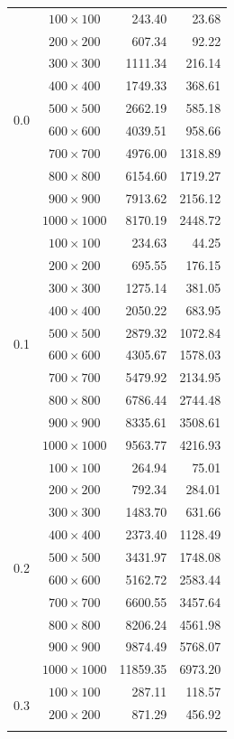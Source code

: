 \documentclass{article}
\begin{document}
\begin{longtable}{|c|c|r|r|}
\multirow{10}{*}{0.0}
&$100\times100$ & 243.40 & 23.68\\*
&$200\times200$ & 607.34 & 92.22\\*
&$300\times300$ & 1111.34 & 216.14\\*
&$400\times400$ & 1749.33 & 368.61\\*
&$500\times500$ & 2662.19 & 585.18\\*
&$600\times600$ & 4039.51 & 958.66\\*
&$700\times700$ & 4976.00 & 1318.89\\*
&$800\times800$ & 6154.60 & 1719.27\\*
&$900\times900$ & 7913.62 & 2156.12\\*
&$1000\times1000$ & 8170.19 & 2448.72\\
\hline
\multirow{10}{*}{0.1}
&$100\times100$ & 234.63 & 44.25\\*
&$200\times200$ & 695.55 & 176.15\\*
&$300\times300$ & 1275.14 & 381.05\\*
&$400\times400$ & 2050.22 & 683.95\\*
&$500\times500$ & 2879.32 & 1072.84\\*
&$600\times600$ & 4305.67 & 1578.03\\*
&$700\times700$ & 5479.92 & 2134.95\\*
&$800\times800$ & 6786.44 & 2744.48\\*
&$900\times900$ & 8335.61 & 3508.61\\*
&$1000\times1000$ & 9563.77 & 4216.93\\
\hline
\multirow{10}{*}{0.2}
&$100\times100$ & 264.94 & 75.01\\*
&$200\times200$ & 792.34 & 284.01\\*
&$300\times300$ & 1483.70 & 631.66\\*
&$400\times400$ & 2373.40 & 1128.49\\*
&$500\times500$ & 3431.97 & 1748.08\\*
&$600\times600$ & 5162.72 & 2583.44\\*
&$700\times700$ & 6600.55 & 3457.64\\*
&$800\times800$ & 8206.24 & 4561.98\\*
&$900\times900$ & 9874.49 & 5768.07\\*
&$1000\times1000$ & 11859.35 & 6973.20\\
\hline
\multirow{10}{*}{0.3}
&$100\times100$ & 287.11 & 118.57\\*
&$200\times200$ & 871.29 & 456.92\\*

\end{longtable}
\end{document}
